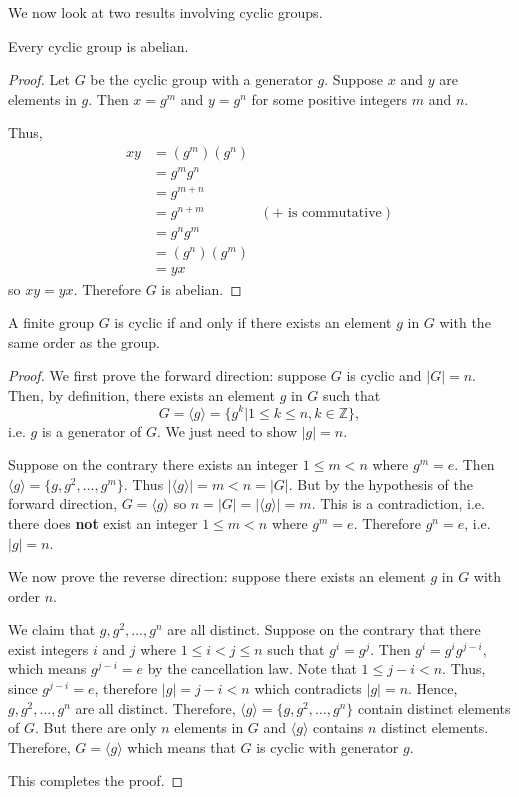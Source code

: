 We now look at two results involving cyclic groups.

\begin{proposition}\label{prop-cyclic-group-is-abelian}
    Every cyclic group is abelian.
\end{proposition}
\begin{proof}
    Let $G$ be the cyclic group with a generator $g$. Suppose $x$ and $y$ are elements in $g$. Then $x = g^m$ and $y = g^n$ for some positive integers $m$ and $n$.

    Thus,
    \begin{align*}
        xy &= (g^m)(g^n)\\
        &= g^mg^n\\
        &= g^{m+n}\\
        &= g^{n+m} & (\text{+ is commutative})\\
        &= g^ng^m\\
        &= (g^n)(g^m)\\
        &= yx
    \end{align*}
    so $xy = yx$. Therefore $G$ is abelian.
\end{proof}

\begin{theorem}\label{thrm-cyclic-group-has-element-with-same-order}
    A finite group $G$ is cyclic if and only if there exists an element $g$ in $G$ with the same order as the group.
\end{theorem}
\begin{proof}
    We first prove the forward direction: suppose $G$ is cyclic and $|G| = n$. Then, by definition, there exists an element $g$ in $G$ such that
    \[
        G = \langle g \rangle = \{g^k \vert 1 \leq k \leq n, k \in \mathbb{Z}\},
    \]
    i.e. $g$ is a generator of $G$. We just need to show $|g| = n$.

    Suppose on the contrary there exists an integer $1 \leq m < n$ where $g^m = e$. Then $\langle g \rangle = \{g, g^2, \dots, g^m\}$. Thus $|\langle g \rangle| = m < n = |G|$. But by the hypothesis of the forward direction, $G = \langle g \rangle$ so $n = |G| = |\langle g \rangle| = m$. This is a contradiction, i.e. there does \textbf{not} exist an integer $1 \leq m < n$ where $g^m = e$. Therefore $g^n = e$, i.e. $|g| = n$.

    We now prove the reverse direction: suppose there exists an element $g$ in $G$ with order $n$.
    
    We claim that $g, g^2, \dots, g^n$ are all distinct. Suppose on the contrary that there exist integers $i$ and $j$ where $1 \leq i < j \leq n$ such that $g^i = g^j$. Then $g^i = g^ig^{j-i}$, which means $g^{j-i} = e$ by the cancellation law. Note that $1 \leq j - i < n$. Thus, since $g^{j-i} = e$, therefore $|g| = j - i < n$ which contradicts $|g| = n$. Hence, $g, g^2, \dots, g^n$ are all distinct. Therefore, $\langle g \rangle = \{g, g^2, \dots, g^n\}$ contain distinct elements of $G$. But there are only $n$ elements in $G$ and $\langle g \rangle$ contains $n$ distinct elements. Therefore, $G = \langle g \rangle$ which means that $G$ is cyclic with generator $g$.

    This completes the proof.
\end{proof}

